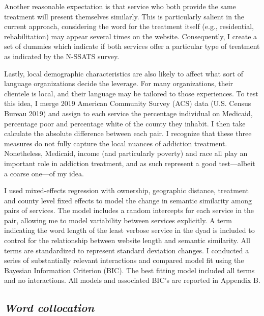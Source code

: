 \documentclass[
  12pt,
]{article}
\begin{document}
\vspace{12pt}

Another reasonable expectation is that service who both provide the same treatment will present themselves similarly. This is particularly salient in the current approach, considering the word for the treatment itself (e.g., residential, rehabilitation) may appear several times on the website. Consequently, I create a set of dummies which indicate if both services offer a particular type of treatment as indicated by the N-SSATS survey.

\vspace{12pt}

Lastly, local demographic characteristics are also likely to affect what sort of language organizations decide the leverage. For many organizations, their clientele is local, and their language may be tailored to those experiences. To test this idea, I merge 2019 American Community Survey (ACS) data (U.S. Census Bureau 2019) and assign to each service the percentage individual on Medicaid, percentage poor and percentage white of the county they inhabit. I then take calculate the absolute difference between each pair. I recognize that these three measures do not fully capture the local nuances of addiction treatment. Nonetheless, Medicaid, income (and particularly poverty) and race all play an important role in addiction treatment, and as such represent a good test---albeit a coarse one---of my idea.

\vspace{12pt}

I used mixed-effects regression with ownership, geographic distance, treatment and county level fixed effects to model the change in semantic similarity among pairs of services. The model includes a random intercepts for each service in the pair, allowing me to model variability between services explicitly. A term indicating the word length of the least verbose service in the dyad is included to control for the relationship between website length and semantic similarity. All terms are standardized to represent standard deviation changes. I conducted a series of substantially relevant interactions and compared model fit using the Bayesian Information Criterion (BIC). The best fitting model included all terms and no interactions. All models and associated BIC's are reported in Appendix B.

\hypertarget{word-collocation}{%
\subsection{\texorpdfstring{\emph{Word collocation}}{Word collocation}}\label{word-collocation}}
\end{document}
